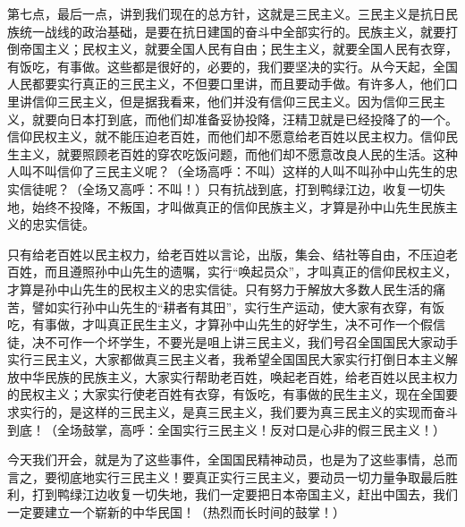 第七点，最后一点，讲到我们现在的总方针，这就是三民主义。三民主义是抗日民族统一战线的政治基础，是要在抗日建国的奋斗中全部实行的。民族主义，就要打倒帝国主义；民权主义，就要全国人民有自由；民生主义，就要全国人民有衣穿，有饭吃，有事做。这些都是很好的，必要的，我们要坚决的实行。从今天起，全国人民都要实行真正的三民主义，不但要口里讲，而且要动手做。有许多人，他们口里讲信仰三民主义，但是据我看来，他们并没有信仰三民主义。因为信仰三民主义，就要向日本打到底，而他们却准备妥协投降，汪精卫就是已经投降了的一个。信仰民权主义，就不能压迫老百姓，而他们却不愿意给老百姓以民主权力。信仰民生主义，就要照顾老百姓的穿农吃饭问题，而他们却不愿意改良人民的生活。这种人叫不叫信仰了三民主义呢？（全场高呼：不叫）这样的人叫不叫孙中山先生的忠实信徒呢？（全场又高呼：不叫！）只有抗战到底，打到鸭绿江边，收复一切失地，始终不投降，不叛国，才叫做真正的信仰民族主义，才算是孙中山先生民族主义的忠实信徒。

只有给老百姓以民主权力，给老百姓以言论，出版，集会、结社等自由，不压迫老百姓，而且遵照孙中山先生的遗嘱，实行“唤起员众”，才叫真正的信仰民权主义，才算是孙中山先生的民权主义的忠实信徒。只有努力于解放大多数人民生活的痛苦，譬如实行孙中山先生的“耕者有其田”，实行生产运动，使大家有衣穿，有饭吃，有事做，才叫真正民生主义，才算孙中山先生的好学生，决不可作一个假信徒，决不可作一个坏学生，不要光是咀上讲三民主义，我们号召全国国民大家动手实行三民主义，大家都做真三民主义者，我希望全国国民大家实行打倒日本主义解放中华民族的民族主义，大家实行帮助老百姓，唤起老百姓，给老百姓以民主权力的民权主义；大家实行使老百姓有衣穿，有饭吃，有事做的民生主义，现在全国要求实行的，是这样的三民主义，是真三民主义，我们要为真三民主义的实现而奋斗到底！（全场鼓掌，高呼：全国实行三民主义！反对口是心非的假三民主义！）

今天我们开会，就是为了这些事件，全国国民精神动员，也是为了这些事情，总而言之，要彻底地实行三民主义！要真正实行三民主义，要动员一切力量争取最后胜利，打到鸭绿江边收复一切失地，我们一定要把日本帝国主义，赶出中国去，我们一定要建立一个崭新的中华民国！（热烈而长时间的鼓掌！）

